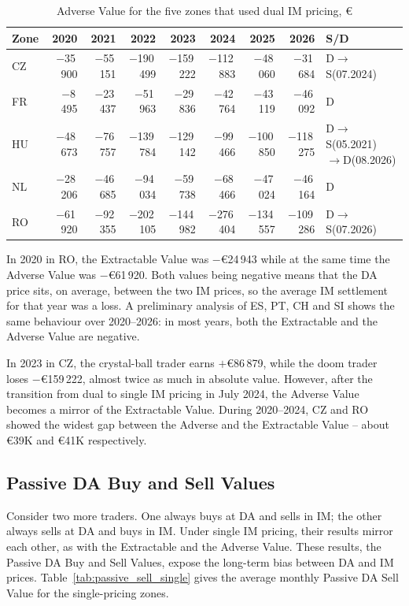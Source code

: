 \documentclass[11pt,a4paper]{article}
\begin{document}
\begin{table}[htbp]
\centering
\small
\setlength{\tabcolsep}{4pt}
\begin{tabular}{@{}l rrrrrrr l@{}}
\toprule
Zone & 2020 & 2021 & 2022 & 2023 & 2024 & 2025 & 2026 & S/D \\
\midrule
CZ & $-$35\,900 & $-$55\,151 & $-$190\,499 & $-$159\,222 & $-$112\,883 & $-$48\,060 & $-$31\,684 & D$\rightarrow$S(07.2024) \\
FR & $-$8\,495 & $-$23\,437 & $-$51\,963 & $-$29\,836 & $-$42\,764 & $-$43\,119 & $-$46\,092 & D \\
HU & $-$48\,673 & $-$76\,757 & $-$139\,784 & $-$129\,142 & $-$99\,466 & $-$100\,850 & $-$118\,275 & D$\rightarrow$S(05.2021) $\rightarrow$D(08.2026) \\
NL & $-$28\,206 & $-$46\,685 & $-$94\,034 & $-$59\,738 & $-$68\,466 & $-$47\,024 & $-$46\,164 & D \\
RO & $-$61\,920 & $-$92\,355 & $-$202\,105 & $-$144\,982 & $-$276\,404 & $-$134\,557 & $-$109\,286 & D$\rightarrow$S(07.2026) \\
\bottomrule
\end{tabular}
\caption{Adverse Value for the five zones that used dual IM pricing, \euro}
\label{tab:av_dual}
\end{table}

In 2020 in RO, the Extractable Value was $-$\euro24\,943 while at the same time the Adverse Value was $-$\euro61\,920. Both values being negative means that the DA price sits, on average, between the two IM prices, so the average IM settlement for that year was a loss. A preliminary analysis of ES, PT, CH and SI shows the same behaviour over 2020--2026: in most years, both the Extractable and the Adverse Value are negative.

In 2023 in CZ, the crystal-ball trader earns $+$\euro86\,879, while the doom trader loses $-$\euro159\,222, almost twice as much in absolute value. However, after the transition from dual to single IM pricing in July 2024, the Adverse Value becomes a mirror of the Extractable Value. During 2020--2024, CZ and RO showed the widest gap between the Adverse and the Extractable Value -- about \euro39K and \euro41K respectively.

\subsection{Passive DA Buy and Sell Values}

Consider two more traders. One always buys at DA and sells in IM; the other always sells at DA and buys in IM. Under single IM pricing, their results mirror each other, as with the Extractable and the Adverse Value. These results, the Passive DA Buy and Sell Values, expose the long-term bias between DA and IM prices. Table~\ref{tab:passive_sell_single} gives the average monthly Passive DA Sell Value for the single-pricing zones.
\end{document}
